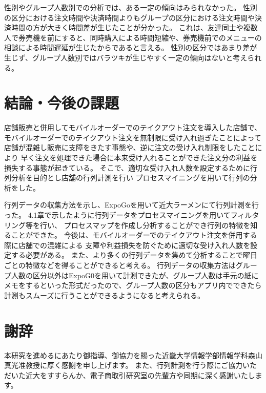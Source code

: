 \documentclass{jsarticle}
\begin{document}
性別やグループ人数別での分析では、ある一定の傾向はみられなかった。
性別の区分における注文時間や決済時間よりもグループの区分における注文時間や決済時間の方が大きく時間差が生じたことが分かった。
これは、友達同士や複数人で券売機を前にすると、同時購入による時間短縮や、券売機前でのメニューの相談による時間遅延が生じたからであると言える。
性別の区分ではあまり差が生じず、グループ人数別ではバラツキが生じやすく一定の傾向はないと考えられる。





\newpage

\section{結論・今後の課題}

店舗販売と併用してモバイルオーダーでのテイクアウト注文を導入した店舗で、
モバイルオーダーでのテイクアウト注文を無制限に受け入れ過ぎたことによって
店舗が混雑し販売に支障をきたす事態や、逆に注文の受け入れ制限をしたことにより
早く注文を処理できた場合に本来受け入れることができた注文分の利益を損失する事態が起きている。
そこで、適切な受け入れ人数を設定するために行列分析を目的とし店舗の行列計測を行い
プロセスマイニングを用いて行列の分析をした。

行列データの収集方法を示し、ExpoGoを用いて近大ラーメンにて行列計測を行った。
4.1章で示したように行列データをプロセスマイニングを用いてフィルタリング等を行い、
プロセスマップを作成し分析することができ行列の特徴を知ることができた。
今後は、モバイルオーダーでのテイクアウト注文を併用する際に店舗での混雑による
支障や利益損失を防ぐために適切な受け入れ人数を設定する必要がある。
また、より多くの行列データを集めて分析することで曜日ごとの特徴などを得ることができると考える。
行列データの収集方法はグループ人数の区分以外はExpoG0を用いて計測できたが、グループ人数は手元の紙にメモをするといった形式だったので、グループ人数の区分もアプリ内でできたら計測もスムーズに行うことができるようになると考えられる。





\newpage

\section{謝辞}
本研究を進めるにあたり御指導、御協力を賜った近畿大学情報学部情報学科森山真光准教授に厚く感謝を申し上げます。
また、行列計測を行う際にご協力いただいた近大をすすらんか、電子商取引研究室の先輩方や同期に深く感謝いたします。
\end{document}
